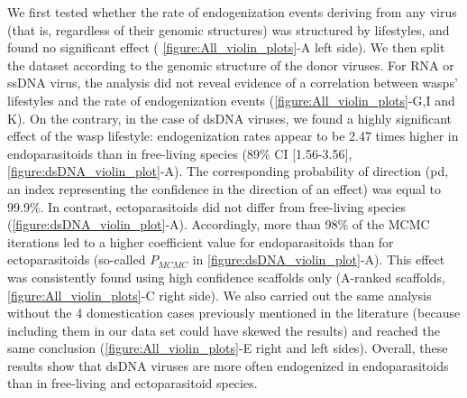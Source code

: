 We first tested whether the rate of endogenization events deriving from any virus (that is, regardless of  their genomic structures) was structured by lifestyles, and found no significant effect (\figurename{ \ref{figure:All_violin_plots}-A left side}). 
We then split the dataset according to the genomic structure of the donor viruses. For RNA or ssDNA virus, the analysis did not reveal evidence of a correlation between wasps' lifestyles and the rate of endogenization events (\figurename{\ref{figure:All_violin_plots}}-G,I and K). On the contrary, in the case of dsDNA viruses, we found a highly significant effect of the wasp lifestyle: endogenization rates appear to be  2.47 times higher in endoparasitoids than in free-living species (89\% CI [1.56-3.56], \figurename{\ref{figure:dsDNA_violin_plot}}-A). The corresponding probability of direction (pd, an index representing the confidence in the direction of an effect) was equal to 99.9\%. In contrast, ectoparasitoids did not differ from free-living species (\figurename{\ref{figure:dsDNA_violin_plot}}-A). Accordingly, more than 98\% of the MCMC iterations led to a higher coefficient value for endoparasitoids than for ectoparasitoids (so-called $P_{MCMC}$ in \figurename{\ref{figure:dsDNA_violin_plot}}-A). This effect was consistently found using high confidence scaffolds only (A-ranked scaffolds, \figurename{\ref{figure:All_violin_plots}}-C right side). We also carried out the same analysis without the 4 domestication cases previously mentioned in the literature (because including them in our data set could have skewed the results) and reached the same conclusion (\figurename{\ref{figure:All_violin_plots}}-E right and left sides). Overall, these results show that dsDNA viruses are more often endogenized in endoparasitoids than in  free-living and ectoparasitoid species.


